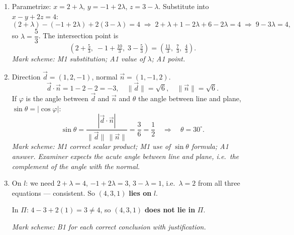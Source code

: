 \documentclass[11pt]{article}
\begin{document}
\begin{corrige}
\begin{enumerate}
\item Parametrize: $x=2+\lambda$, $y=-1+2\lambda$, $z=3-\lambda$. Substitute into $x-y+2z=4$:
\[
(2+\lambda)-(-1+2\lambda)+2(3-\lambda)=4
\;\Longrightarrow\;
2+\lambda+1-2\lambda+6-2\lambda=4
\;\Longrightarrow\;
9-3\lambda=4,
\]
so $\lambda=\dfrac{5}{3}$. The intersection point is
\[
\left(2+\tfrac{5}{3},\;-1+\tfrac{10}{3},\;3-\tfrac{5}{3}\right)=\boxed{\left(\tfrac{11}{3},\;\tfrac{7}{3},\;\tfrac{4}{3}\right)}.
\]
\emph{Mark scheme: M1 substitution; A1 value of $\lambda$; A1 point.}

\item Direction $\vec{d}=(1,2,-1)$, normal $\vec{n}=(1,-1,2)$.
\[
\vec{d}\cdot\vec{n}=1-2-2=-3,\quad \|\vec{d}\|=\sqrt{6},\quad \|\vec{n}\|=\sqrt{6}.
\]
If $\varphi$ is the angle between $\vec{d}$ and $\vec{n}$ and $\theta$ the angle between line and plane, $\sin\theta=|\cos\varphi|$:
\[
\sin\theta=\frac{|\vec{d}\cdot\vec{n}|}{\|\vec{d}\|\,\|\vec{n}\|}=\frac{3}{6}=\frac12
\quad\Longrightarrow\quad \boxed{\theta=30^{\circ}}.
\]
\emph{Mark scheme: M1 correct scalar product; M1 use of $\sin\theta$ formula; A1 answer. Examiner expects the acute angle between line and plane, i.e.\ the complement of the angle with the normal.}

\item On $l$: we need $2+\lambda=4$, $-1+2\lambda=3$, $3-\lambda=1$, i.e.\ $\lambda=2$ from all three equations — consistent. So $(4,3,1)$ \textbf{lies on} $l$.\par
In $\Pi$: $4-3+2(1)=3\neq 4$, so $(4,3,1)$ \textbf{does not lie in} $\Pi$.\par
\emph{Mark scheme: B1 for each correct conclusion with justification.}
\end{enumerate}
\end{corrige}
\end{document}
